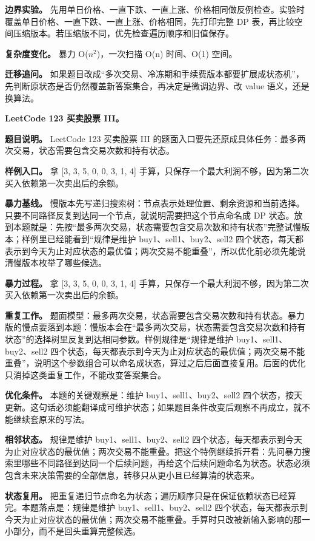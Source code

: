 \textbf{边界实验。} 先用单日价格、一直下跌、一直上涨、价格相同做反例检查。实验时覆盖单日价格、一直下跌、一直上涨、价格相同，先打印完整 DP 表，再比较空间压缩版本。若压缩版不同，优先检查遍历顺序和旧值保存。

\textbf{复杂度变化。} 暴力 O(\ensuremath{n^{2}})，一次扫描 O(n) 时间、O(1) 空间。

\textbf{迁移追问。} 如果题目改成“多次交易、冷冻期和手续费版本都要扩展成状态机”，先判断原状态是否仍然覆盖新答案集合，再决定是微调边界、改 value 语义，还是换算法。

\noindent\textbf{LeetCode 123 买卖股票 III。}

\textbf{题目说明。} LeetCode 123 买卖股票 III 的题面入口要先还原成具体任务：最多两次交易，状态需要包含交易次数和持有状态。

\textbf{样例入口。} 拿 [3, 3, 5, 0, 0, 3, 1, 4] 手算，只保存一个最大利润不够，因为第二次买入依赖第一次卖出后的余额。

\textbf{暴力基线。} 慢版本先写递归搜索树：节点表示处理位置、剩余资源和当前选择。只要不同路径反复到达同一个节点，就说明需要把这个节点命名成 DP 状态。放到本题就是：先按“最多两次交易，状态需要包含交易次数和持有状态”完整试慢版本；样例里已经能看到“规律是维护 buy1、sell1、buy2、sell2 四个状态，每天都表示到今天为止对应状态的最优值；两次交易不能重叠”，所以优化前必须先能说清慢版本枚举了哪些候选。

\textbf{暴力过程。} 拿 [3, 3, 5, 0, 0, 3, 1, 4] 手算，只保存一个最大利润不够，因为第二次买入依赖第一次卖出后的余额。

\textbf{重复工作。} 题面模型：最多两次交易，状态需要包含交易次数和持有状态。暴力版的慢点要落到本题：慢版本会在“最多两次交易，状态需要包含交易次数和持有状态”的选择树里反复到达相同参数。样例规律是“规律是维护 buy1、sell1、buy2、sell2 四个状态，每天都表示到今天为止对应状态的最优值；两次交易不能重叠”，说明这个参数组合可以命名成状态，算过之后后面直接复用。后面的优化只消掉这类重复工作，不能改变答案集合。

\textbf{优化条件。} 本题的关键观察是：维护 buy1、sell1、buy2、sell2 四个状态，按天更新。这句话必须能翻译成可维护状态；如果题目条件改变后观察不再成立，就不能继续套原来的写法。

\textbf{相邻状态。} 规律是维护 buy1、sell1、buy2、sell2 四个状态，每天都表示到今天为止对应状态的最优值；两次交易不能重叠。把这个特例继续拆开看：先问暴力搜索里哪些不同路径到达同一个后续问题，再给这个后续问题命名为状态。状态必须包含未来决策需要的全部信息，转移只从更小且已经算清的状态来。

\textbf{状态复用。} 把重复递归节点命名为状态；遍历顺序只是在保证依赖状态已经算完。本题落点是：规律是维护 buy1、sell1、buy2、sell2 四个状态，每天都表示到今天为止对应状态的最优值；两次交易不能重叠。手算时只改被新输入影响的那一小部分，而不是回头重算完整候选。

